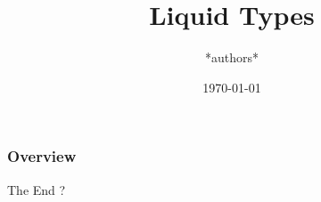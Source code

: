 \documentclass{beamer}
\title[Short title]{Liquid Types}
\author{*authors*}
\institute[UCM/UAM/UPM]{
Complutense University of Madrid  \\ 
\medskip
}
\date{\today}
\begin{document}
\begin{frame}
\titlepage 
\end{frame}

\begin{frame}
\frametitle{Overview} 
\tableofcontents 
\end{frame}






\begin{frame}{The End}
\centering ?
\end{frame}
\end{document}
